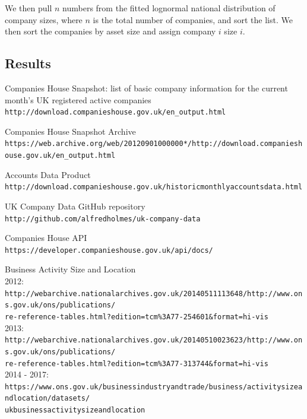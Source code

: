 \documentclass[a4paper,10pt]{article}
\begin{document}
   We then pull $n$ numbers from the fitted lognormal national distribution of company sizes, where $n$ is the total number of companies, and sort the list. We then sort the companies by asset size and assign company $i$ size $i$.

   \subsection{Results}

   \medskip


   \begin{thebibliography}{9}
      Companies House Snapshot: list of basic company information for the current month's UK registered active companies
      \\\texttt{http://download.companieshouse.gov.uk/en\_output.html}

      Companies House Snapshot Archive
      \\\texttt{https://web.archive.org/web/20120901000000*/http://download.companieshouse.gov.uk/en\_output.html}

      Accounts Data Product
      \\\texttt{http://download.companieshouse.gov.uk/historicmonthlyaccountsdata.html}
      
      UK Company Data GitHub repository
      \\\texttt{http://github.com/alfredholmes/uk-company-data}

      Companies House API
      \\\texttt{https://developer.companieshouse.gov.uk/api/docs/}

      Business Activity Size and Location
      \\2012:
      \\\texttt{http://webarchive.nationalarchives.gov.uk/20140511113648/http://www.ons.gov.uk/ons/publications/\\re-reference-tables.html?edition=tcm\%3A77-254601\&format=hi-vis}
      \\2013:
      \\\texttt{http://webarchive.nationalarchives.gov.uk/20140510023623/http://www.ons.gov.uk/ons/publications/\\re-reference-tables.html?edition=tcm\%3A77-313744\&format=hi-vis}
      \\2014 - 2017:
      \\\texttt{https://www.ons.gov.uk/businessindustryandtrade/business/activitysizeandlocation/datasets/\\ukbusinessactivitysizeandlocation}
      

\end{thebibliography}
\end{document}
